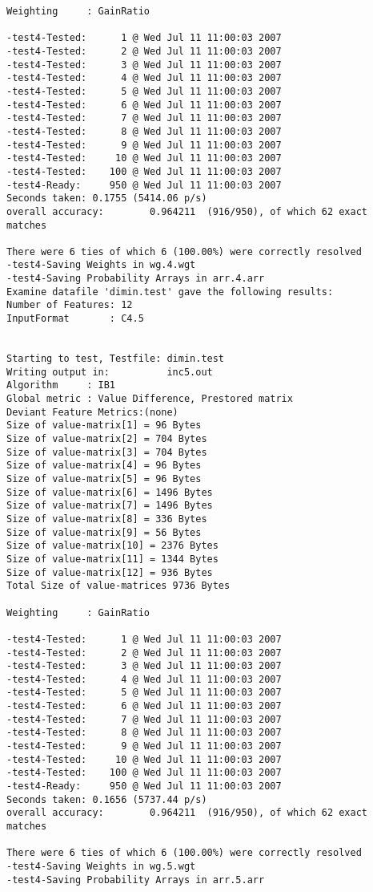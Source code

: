 \documentclass{report}
\begin{document}
\begin{footnotesize}
\begin{verbatim}
Weighting     : GainRatio

-test4-Tested:      1 @ Wed Jul 11 11:00:03 2007
-test4-Tested:      2 @ Wed Jul 11 11:00:03 2007
-test4-Tested:      3 @ Wed Jul 11 11:00:03 2007
-test4-Tested:      4 @ Wed Jul 11 11:00:03 2007
-test4-Tested:      5 @ Wed Jul 11 11:00:03 2007
-test4-Tested:      6 @ Wed Jul 11 11:00:03 2007
-test4-Tested:      7 @ Wed Jul 11 11:00:03 2007
-test4-Tested:      8 @ Wed Jul 11 11:00:03 2007
-test4-Tested:      9 @ Wed Jul 11 11:00:03 2007
-test4-Tested:     10 @ Wed Jul 11 11:00:03 2007
-test4-Tested:    100 @ Wed Jul 11 11:00:03 2007
-test4-Ready:     950 @ Wed Jul 11 11:00:03 2007
Seconds taken: 0.1755 (5414.06 p/s)
overall accuracy:        0.964211  (916/950), of which 62 exact matches 

There were 6 ties of which 6 (100.00%) were correctly resolved
-test4-Saving Weights in wg.4.wgt
-test4-Saving Probability Arrays in arr.4.arr
Examine datafile 'dimin.test' gave the following results:
Number of Features: 12
InputFormat       : C4.5


Starting to test, Testfile: dimin.test
Writing output in:          inc5.out
Algorithm     : IB1
Global metric : Value Difference, Prestored matrix
Deviant Feature Metrics:(none)
Size of value-matrix[1] = 96 Bytes 
Size of value-matrix[2] = 704 Bytes 
Size of value-matrix[3] = 704 Bytes 
Size of value-matrix[4] = 96 Bytes 
Size of value-matrix[5] = 96 Bytes 
Size of value-matrix[6] = 1496 Bytes 
Size of value-matrix[7] = 1496 Bytes 
Size of value-matrix[8] = 336 Bytes 
Size of value-matrix[9] = 56 Bytes 
Size of value-matrix[10] = 2376 Bytes 
Size of value-matrix[11] = 1344 Bytes 
Size of value-matrix[12] = 936 Bytes 
Total Size of value-matrices 9736 Bytes 

Weighting     : GainRatio

-test4-Tested:      1 @ Wed Jul 11 11:00:03 2007
-test4-Tested:      2 @ Wed Jul 11 11:00:03 2007
-test4-Tested:      3 @ Wed Jul 11 11:00:03 2007
-test4-Tested:      4 @ Wed Jul 11 11:00:03 2007
-test4-Tested:      5 @ Wed Jul 11 11:00:03 2007
-test4-Tested:      6 @ Wed Jul 11 11:00:03 2007
-test4-Tested:      7 @ Wed Jul 11 11:00:03 2007
-test4-Tested:      8 @ Wed Jul 11 11:00:03 2007
-test4-Tested:      9 @ Wed Jul 11 11:00:03 2007
-test4-Tested:     10 @ Wed Jul 11 11:00:03 2007
-test4-Tested:    100 @ Wed Jul 11 11:00:03 2007
-test4-Ready:     950 @ Wed Jul 11 11:00:03 2007
Seconds taken: 0.1656 (5737.44 p/s)
overall accuracy:        0.964211  (916/950), of which 62 exact matches 

There were 6 ties of which 6 (100.00%) were correctly resolved
-test4-Saving Weights in wg.5.wgt
-test4-Saving Probability Arrays in arr.5.arr
\end{verbatim}
\end{footnotesize}
\clearpage
\end{document}
